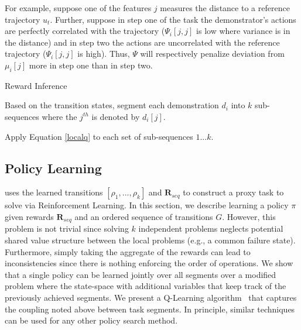 For example, suppose one of the features $j$ measures the distance to a reference trajectory $u_t$. 
Further, suppose in step one of the task the demonstrator's actions are perfectly correlated with the trajectory ($\Psi_{i}[j,j]$ is low where variance is in the distance) and in step two the actions are uncorrelated with the reference trajectory ($\Psi_{i}[j,j]$ is high).
Thus, $\Psi$ will respectively penalize deviation from $\mu_{i}[j]$ more in step one than in step two.


\begin{algorithmic}[t]
\small
\caption{Reward Inference \label{alg:tsh2}}

Based on the transition states, segment each demonstration $d_i$ into $k$ sub-sequences where the $j^{th}$ is denoted by $d_i[j]$.

Apply Equation \ref{localq} to each set of sub-sequences $1...k$.

\end{algorithmic}



\subsection{Policy Learning}
 \hirl uses the learned transitions $[\rho_1,...,\rho_k]$ and $\mathbf{R}_{seq}$ to construct a proxy task to solve via Reinforcement Learning. In this section, we describe learning a policy $\pi$ given rewards $\mathbf{R}_{seq}$ and an ordered sequence of transitions $G$.
However, this problem is not trivial since solving $k$ independent problems neglects potential shared value structure between the local problems (e.g., a common failure state).
Furthermore, simply taking the aggregate of the rewards can lead to inconsistencies since there is nothing enforcing the order of operations.
We show that a single policy can be learned jointly over all segments over a modified problem where the state-space with additional variables that keep track of the previously achieved segments.
We present a Q-Learning algorithm~\cite{mnih2015human,sutton1998reinforcement} that captures the coupling noted above between task segments.
In principle, similar techniques can be used for any other policy search method.

